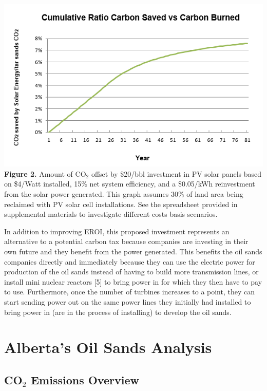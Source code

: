 \documentclass[11pt]{article}
\begin{document}
\begin{center}
\includegraphics{g2.png}
{\bf Figure 2.} Amount of CO$_2$ offset by \$20/bbl investment in PV solar panels based on \$4/Watt installed, 15\% net system efficiency, and a \$0.05/kWh reinvestment from the solar power generated. This graph assumes 30\% of land area being reclaimed with PV solar cell installations. See the spreadsheet provided in supplemental materials to investigate different costs basis scenarios.
\end{center}

In addition to improving EROI, this proposed investment represents an alternative to a potential carbon tax because companies are investing in their own future and they benefit from the power generated.  This benefits the oil sands companies directly and immediately because they can use the electric power for production of the oil sands instead of having to build more transmission lines, or install mini nuclear reactors [5] to bring power in for which they then have to pay to use. Furthermore, once the number of turbines increases to a point, they can start sending power out on the same power lines they initially had installed to bring power in (are in the process of installing) to develop the oil sands.


\section{Alberta's Oil Sands Analysis}

\subsection{CO$_2$ Emissions Overview}
\end{document}
